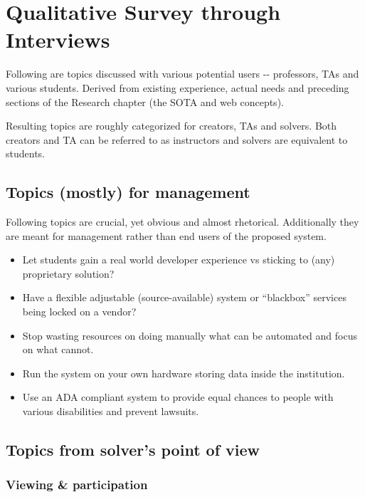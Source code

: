 \section{Qualitative Survey through Interviews} \label{sec:qualitative}

{Following are topics discussed with various potential users -\/- professors, TAs and various students. Derived from existing experience, actual needs and preceding sections of the Research chapter (the SOTA and web concepts).}

{Resulting topics are roughly categorized for creators, TAs and solvers. Both creators and TA can be referred to as instructors and solvers are equivalent to students.}

\subsection{Topics (mostly) for management} \label{ssec:management}

{Following topics are crucial, yet obvious and almost rhetorical. Additionally they are meant for management rather than end users of the proposed system.}

\begin{itemize}
\item
  {Let students gain a real world developer experience vs sticking to (any) proprietary solution?}
\item
  {Have a flexible adjustable (source-available) system or ``blackbox'' services being locked on a vendor?}
\item
  {Stop wasting resources on doing manually what can be automated and focus on what cannot.}
\item
  {Run the system on your own hardware storing data inside the institution.}
\item
  {Use an ADA compliant system to provide equal chances to people with various disabilities and prevent lawsuits.}
\end{itemize}

\subsection{Topics from solver's point of view} \label{ssec:solver}

\subsubsection{Viewing \& participation}

